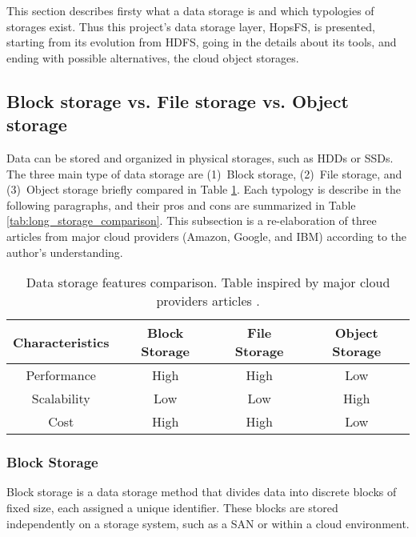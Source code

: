 This section describes firsty what a data storage is and which typologies of storages exist. Thus this project's data storage layer, \gls{HopsFS}, is presented, starting from its evolution from \gls{HDFS}, going in the details about its tools, and ending with possible alternatives, the cloud object storages.

\subsection{Block storage vs. File storage vs. Object storage}
\label{subsec:block_vs_file_vs_object}

Data can be stored and organized in physical storages, such as \glspl{HDD} or \glspl{SSD}. The three main type of data storage are (1)~Block storage, (2)~File storage, and (3)~Object storage briefly compared in Table \ref{tab:short_storage_comparison}. Each typology is describe in the following paragraphs, and their pros and cons are summarized in Table \ref{tab:long_storage_comparison}. This subsection is a re-elaboration of three articles from major cloud providers (Amazon, Google, and IBM) \cite{BlockVsFile, HowObjectVs, ObjectVsFile2021} according to the author's understanding.

\begin{table}[!ht]
    \begin{center}
      \caption[Data storage features comparison]{Data storage features comparison. Table inspired by major cloud providers articles \cite{BlockVsFile,HowObjectVs,ObjectVsFile2021}.}
      \label{tab:short_storage_comparison}
      \begin{tabular}{cccc}
        \toprule
        \textbf{Characteristics} & \textbf{Block Storage} & \textbf{File Storage} & \textbf{Object Storage}\\
        \midrule
        Performance & High & High & Low\\
        Scalability & Low & Low & High\\
        Cost & High & High & Low\\
        \bottomrule
      \end{tabular}
    \end{center}
\end{table}

\subsubsection*{Block Storage}

Block storage is a data storage method that divides data into discrete blocks of fixed size, each assigned a unique identifier. These blocks are stored independently on a storage system, such as a \gls{SAN} or within a cloud environment. 

